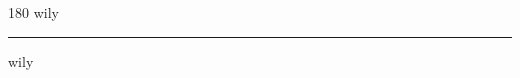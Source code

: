 
\begin{frame}
\begin{center}
\begin{turn}{180}
{\fontsize{2.5cm}{1em}\selectfont wily}
\end{turn}
\vspace{1em}\par  
\hrule
\vspace{1em}\par  
{\fontsize{2.5cm}{1em}\selectfont wily}
\end{center}
\end{frame}
